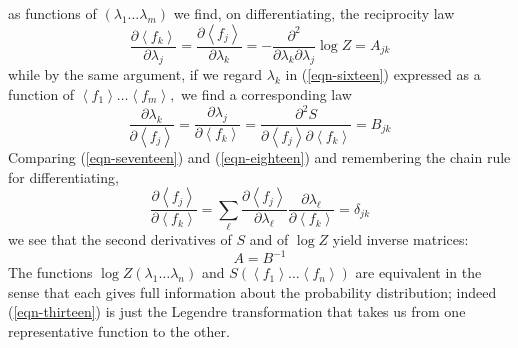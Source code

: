 \documentclass[]{article}
\begin{document}
as functions of \(\left( \lambda_{1}\ldots\lambda_{m} \right)\) we find,
on differentiating, the reciprocity law
%
\begin{equation}
\frac{\partial\left\langle f_{k} \right\rangle}{\partial\lambda_{j}} = \frac{\partial\left\langle f_{j} \right\rangle}{\partial\lambda_{k}} = - \frac{\partial^{2}}{\partial\lambda_{k}\partial\lambda_{j}} \log Z = A_{jk} \label{eqn-seventeen}
\end{equation}
%
while by the same argument, if we regard \(\lambda_{k}\) in (\ref{eqn-sixteen})
expressed as a function of \(\left\langle f_{1} \right\rangle\ldots\left\langle f_{m} \right\rangle,\) we find a corresponding law
%
\begin{equation}
\frac{\partial\lambda_{k}}{\partial\left\langle f_{j} \right\rangle} = \frac{\partial\lambda_{j}}{\partial\left\langle f_{k} \right\rangle} = \frac{\partial^{2}S}{\partial\left\langle f_{j} \right\rangle\partial\left\langle f_{k} \right\rangle} = B_{jk} \label{eqn-eighteen}
\end{equation}
%
Comparing (\ref{eqn-seventeen}) and (\ref{eqn-eighteen}) and remembering the chain rule for
differentiating,
%
\begin{equation*}
\frac{\partial\left\langle f_{j} \right\rangle}{\partial\left\langle f_{k} \right\rangle} = \sum_{ \ell}^{} \frac{\partial\left\langle f_{j} \right\rangle}{\partial\lambda_{ \ell}}\frac{\partial\lambda_{ \ell}}{\partial\left\langle f_{k} \right\rangle} = \delta_{jk}
\end{equation*}
%
we see that the second derivatives of \(S\) and of $\log Z$ yield
inverse matrices:
%
\begin{equation}
A = B^{- 1}
\end{equation}
%
The functions \( \log Z\left( \lambda_{1}\ldots\lambda_{n} \right)\) and
\(S\left( \left\langle f_{1} \right\rangle\ldots\left\langle f_{n} \right\rangle \right)\)
are equivalent in the sense that each gives full information about the
probability distribution; indeed (\ref{eqn-thirteen}) is just the Legendre
transformation that takes us from one representative function to the
other.
\end{document}

